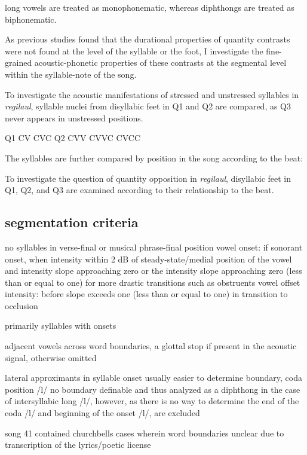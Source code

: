 long vowels are treated as monophonematic, whereas diphthongs are treated as biphonematic. 

\cite{lehiste85, vago85}

As previous studies found that the durational properties of quantity contrasts were not found at the level of the syllable or the foot, I investigate the fine-grained acoustic-phonetic properties of these contrasts at the segmental level within the syllable-note of the song. 


To investigate the acoustic manifestations of stressed and unstressed syllables in {\it regilaul}, syllable nuclei from disyllabic feet in Q1 and Q2 are compared, as Q3 never appears in unstressed positions. 

Q1	CV 		CVC
Q2 	CVV		CVVC 	CVCC

The syllables are further compared by position in the song according to the beat: 

To investigate the question of quantity opposition in {\it regilaul}, disyllabic feet in Q1, Q2, and Q3 are examined according to their relationship to the beat. 



\subsection{segmentation criteria}

no syllables in verse-final or musical phrase-final position
vowel onset:
if sonorant onset, when intensity within 2 dB of steady-state/medial position of the vowel and intensity slope approaching zero
or the intensity slope approaching zero (less than or equal to one) for more drastic transitions such as obstruents
vowel offset intensity: before slope exceeds one (less than or equal to one) in transition to occlusion

primarily syllables with onsets

adjacent vowels across word boundaries, a glottal stop if present in the acoustic signal, otherwise omitted

lateral approximants in syllable onset usually easier to determine boundary, coda position /l/ no boundary definable and thus analyzed as a diphthong
in the case of intersyllabic long /l/, however, as there is no way to determine the end of the coda /l/ and beginning of the onset /l/, are excluded

song 41 contained churchbells
cases wherein word boundaries unclear due to transcription of the lyrics/poetic license

